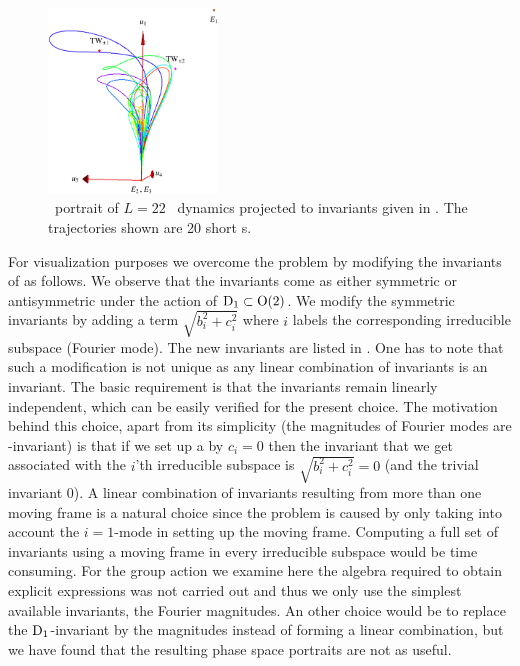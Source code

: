 \begin{figure}[t]
\begin{center}
\includegraphics[width=0.4\textwidth, clip=true]{../figs/ksSO2inv145eqbTo0}
\end{center}
\caption[\KS\  reduced \statesp, modified invariants]
   {\Statesp\ portrait of $L=22$ \KS\ dynamics projected to
   invariants given in . The trajectories
   shown are 20 short \rpo s. }
\label{fig:ksSO2eqbTo0}
\end{figure}

For visualization purposes we overcome the problem by modifying
the invariants of  as follows. We observe
that the invariants come as either symmetric or antisymmetric
under the action of $\mathrm{D}_{1}\subset\mathrm{O}(2)$. We modify the
symmetric invariants by adding a term $\sqrt{b_i^2+c_i^2}$
where $i$ labels the corresponding irreducible subspace  (Fourier
mode). The new invariants are listed in
. 
One has to note that such a modification is not unique as any
linear combination of invariants is an invariant. The basic
requirement is that the invariants remain linearly
independent, which can be easily verified for the present
choice. The motivation behind this choice, apart from its
simplicity (the magnitudes of Fourier modes are -invariant) is
that if we set up a {\csection} by $c_i=0$ then the
invariant that we get associated with the $i$'th irreducible
subspace is $\sqrt{b_i^2+c_i^2}=0$ (and the trivial invariant
$0$). A linear combination of invariants resulting from more
than one moving frame is a natural choice since the problem
is caused by only taking into account the $i=1$-mode in
setting up the moving frame. Computing a full set of
invariants using a moving frame in every irreducible subspace
would be time consuming. For the group action we examine here
the algebra required to obtain explicit expressions was not
carried out 
and thus we only use the simplest available invariants, the
Fourier magnitudes. An other choice would be to replace the
$\mathrm{D}_{1}$-invariant by the  magnitudes instead of forming a
linear combination, but we have found that the resulting
phase space portraits are not as useful.


